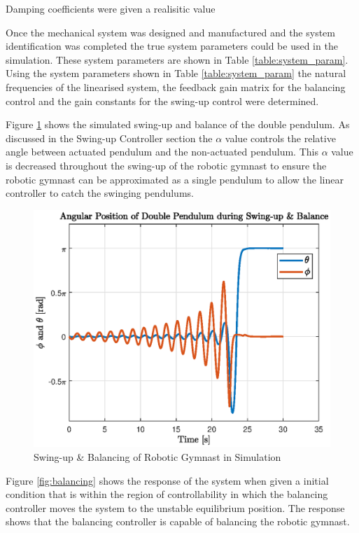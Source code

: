 \documentclass[a4paper,12pt]{article}
\begin{document}
	Damping coefficients were given a realisitic value
	
	Once the mechanical system was designed and manufactured and the system identification was completed the true system parameters could be used in the simulation. These system parameters are shown in Table \ref{table:system_param}. Using the system parameters shown in Table \ref{table:system_param} the natural frequencies of the linearised system, the feedback gain matrix for the balancing control and the gain constants for the swing-up control were determined. 
	
	Figure \ref{fig:swingup&balance} shows the simulated swing-up and balance of the double pendulum. As discussed in the Swing-up Controller section the $\alpha$ value controls the relative angle between actuated pendulum and the non-actuated pendulum. This $\alpha$ value is decreased throughout the swing-up of the robotic gymnast to ensure the robotic gymnast can be approximated as a single pendulum to allow the linear controller to catch the swinging pendulums.
	
		
	\begin{figure}[h]
		\centering
		\includegraphics[scale=1]{swingup_balance.eps}
		\caption{Swing-up \& Balancing of Robotic Gymnast in Simulation }
		\label{fig:swingup&balance}
	\end{figure}
	
	
	Figure \ref{fig:balancing} shows the response of the system when given a initial condition that is within the region of controllability in which the balancing controller moves the system to the unstable equilibrium position. The response shows that the balancing controller is capable of balancing the robotic gymnast.
	
\end{document}
